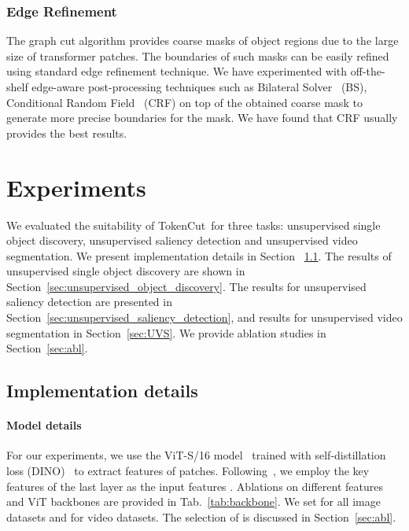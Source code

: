 \documentclass[twocolumn]{article}
\newcommand{\name} {TokenCut}
\begin{document}
\subsubsection{Edge Refinement}

The graph cut algorithm provides coarse masks of object regions due to the large size of transformer patches. The boundaries of such masks can be easily refined using standard edge refinement technique. We have experimented with off-the-shelf edge-aware post-processing techniques such as Bilateral Solver~\cite{barron2016fast} (BS), Conditional Random Field~\cite{krahenbuhl2011efficient} (CRF) on top of the obtained coarse mask to generate more precise boundaries for the mask. We have found that CRF usually provides the best results. 



    
	
	 
	 
	 
	
    

\hfill \break
\section{Experiments}
\label{sec:exp}
We evaluated the suitability of \name~for three tasks: unsupervised single object discovery, unsupervised saliency detection and unsupervised video segmentation. We present implementation details in Section ~\ref{sec:implementation_details}. The results of unsupervised single object discovery are shown in Section~\ref{sec:unsupervised_object_discovery}.  The results for unsupervised saliency detection are presented in Section~\ref{sec:unsupervised_saliency_detection}, and results for unsupervised video segmentation in Section~\ref{sec:UVS}. We provide ablation studies in Section~\ref{sec:abl}.

\subsection{Implementation details}
\label{sec:implementation_details}

\paragraph*{Model details}
For our experiments, we use the ViT-S/16 model~\cite{dosovitskiy2020image} trained with self-distillation loss (DINO)~\cite{caron2021emerging} to extract features of patches. Following~\cite{simeoni2021localizing}, we employ the key features of the last layer as the input features . Ablations on different features and ViT backbones are  provided in Tab.~\ref{tab:backbone}. We set  for all image datasets and  for video datasets. The selection of  is discussed in Section~\ref{sec:abl}.
\end{document}
